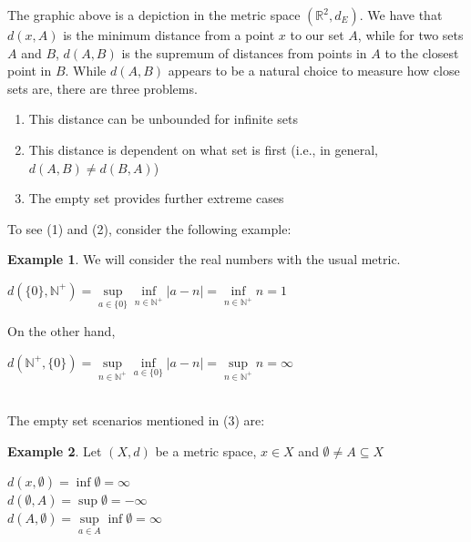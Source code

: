\documentclass{article}
\theoremstyle{plain}
\theoremstyle{definition}
\newtheorem*{ex}{Example}
\theoremstyle{remark}
\begin{document}
The graphic above is a depiction in the metric space $(\mathbb{R}^2, d_E)$. We have that $d(x,A)$ is the minimum distance from a point $x$ to our set $A$, while for two sets $A$ and $B$, $d(A,B)$ is the supremum of distances from points in $A$ to the closest point in $B$. While $d(A,B)$ appears to be a natural choice to measure how close sets are, there are three problems. 
\begin{enumerate}
    \item This distance can be unbounded for infinite sets
    \item This distance is dependent on what set is first (i.e., in general, $d(A,B) \ne d(B,A)$)
    \item The empty set provides further extreme cases
\end{enumerate}
To see (1) and (2), consider the following example:
\begin{ex}
    We will consider the real numbers with the usual metric.
    \begin{center}
        $d(\{0\}, \mathbb{N}^+) = \sup \limits _{a \in \{0\}} \inf \limits _{n\in \mathbb{N}^+} |a-n| = \inf \limits _{n \in \mathbb{N}^+} n = 1$
    \end{center}
    On the other hand,
    \begin{center}
        $d(\mathbb{N}^+, \{0\}) = \sup \limits _{n \in \mathbb{N}^+} \inf \limits _{a\in \{0\}} |a-n| = \sup \limits _{n \in \mathbb{N}^+} n = \infty$
    \end{center}
\end{ex}
~\\ The empty set scenarios mentioned in (3) are:
\begin{ex}
    Let $(X,d)$ be a metric space, $x \in X$ and $\emptyset \ne  A \subseteq X$
    \begin{center}
        $d(x,\emptyset)=\inf \emptyset = \infty$ \\
        $d(\emptyset, A)=\sup \emptyset = -\infty$ \\
        $d(A, \emptyset) = \sup \limits _{a\in A} \inf \emptyset = \infty$   
    \end{center}
\end{ex}
\end{document}
